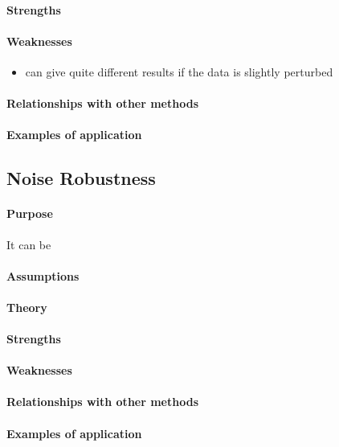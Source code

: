 \paragraph{Strengths}

\paragraph{Weaknesses}
\begin{itemize}
    \item can give quite different results if the data is slightly perturbed
\end{itemize}
\paragraph{Relationships with other methods}
\paragraph{Examples of application}

\subsection{Noise Robustness}
\paragraph{Purpose}
It can be  
\paragraph{Assumptions} 
\paragraph{Theory}
\paragraph{Strengths}
\paragraph{Weaknesses}
\paragraph{Relationships with other methods}
\paragraph{Examples of application}


